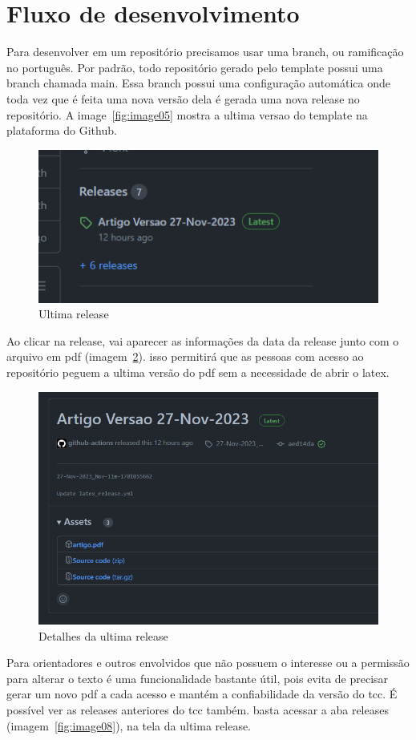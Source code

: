 \section{Fluxo de desenvolvimento}\label{sec:figs}

Para desenvolver em um repositório precisamos usar uma branch, ou ramificação no português. Por padrão, todo repositório gerado pelo template possui uma branch chamada main. Essa branch possui uma configuração automática onde toda vez que é feita uma nova versão dela é gerada uma nova release no repositório. A image~\ref{fig:image05} mostra a ultima versao do template na plataforma do Github.

\begin{figure}[ht]
	\centering
	\includegraphics[width=.5\textwidth]{./images/image06.png}
	\caption{Ultima release}
	\label{fig:image06}
\end{figure}


Ao clicar na release, vai aparecer as informações da data da release junto com o arquivo em pdf (imagem~\ref{fig:image07}). isso permitirá que as pessoas com acesso ao repositório peguem a ultima versão do pdf sem a necessidade de abrir o latex.

\begin{figure}[ht]
	\centering
	\includegraphics[width=.5\textwidth]{./images/image07.png}
	\caption{Detalhes da ultima release}
	\label{fig:image07}
\end{figure}

Para orientadores e outros envolvidos que não possuem o interesse ou a permissão para alterar o texto é uma funcionalidade bastante útil, pois evita de precisar gerar um novo pdf a cada acesso e mantém a confiabilidade da versão do tcc.
É possível ver as releases anteriores do tcc também. basta acessar a aba releases (imagem~\ref{fig:image08}), na tela da ultima release.


